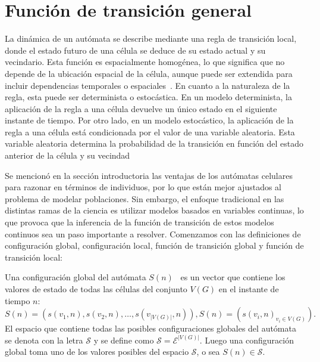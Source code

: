 \section{Funci\'on de transici\'on general}
\label{subsec-function}
La dinámica de un autómata se describe mediante una regla de transición local, donde el estado futuro de una célula se deduce de su estado actual y su vecindario. Esta función es espacialmente homogénea, lo que significa que no depende de la ubicación espacial de la célula, aunque puede ser extendida para incluir dependencias temporales o espaciales~\cite{book}. En cuanto a la naturaleza de la regla, esta puede ser determinista o estocástica. En un modelo determinista, la aplicación de la regla a una célula devuelve un único estado en el siguiente instante de tiempo. Por otro lado, en un modelo estocástico, la aplicación de la regla a una célula está condicionada por el valor de una variable aleatoria. Esta variable aleatoria determina la probabilidad de la transición en función del estado anterior de la célula y su vecindad~\cite{book}

Se mencion\'o en la secci\'on introductoria las ventajas de los aut\'omatas celulares para razonar en t\'erminos de individuos, por lo que est\'an mejor ajustados al problema de modelar poblaciones. Sin embargo, el enfoque tradicional en las distintas ramas de la ciencia es utilizar modelos basados en variables continuas, lo que provoca que la inferencia de la funci\'on de transici\'on de estos modelos continuos sea un paso importante a resolver. Comenzamos con las definiciones de configuraci\'on global, configuraci\'on local, funci\'on de transici\'on global y funci\'on de transici\'on local:

\begin{definition}
\label{def-global-conf}
Una configuraci\'on global del aut\'omata $S(n)$~\cite{book} es un vector que contiene los valores de estado de todas las c\'elulas del conjunto $V(G)$ en el instante de tiempo $n$:
\begin{subequations}
\begin{equation}
S(n)=\left(s(v_1,n),s(v_2,n),\ldots,s(v_{|V(G)|},n)\right), \label{eq-global-conf}
\end{equation}
\begin{equation}
S(n)=\left(s(v_i,n)_{v_i \in V(G)}\right). \label{eq-global-conf-2}
\end{equation}
\end{subequations}
El espacio que contiene todas las posibles configuraciones globales del aut\'omata se denota con la letra $\mathcal{S}$ y se define como $\mathcal{S}=\mathcal{E}^{|V(G)|}$. Luego una configuraci\'on global toma uno de los valores posibles del espacio $\mathcal{S}$, o sea $S(n) \in \mathcal{S}$.
\end{definition}

